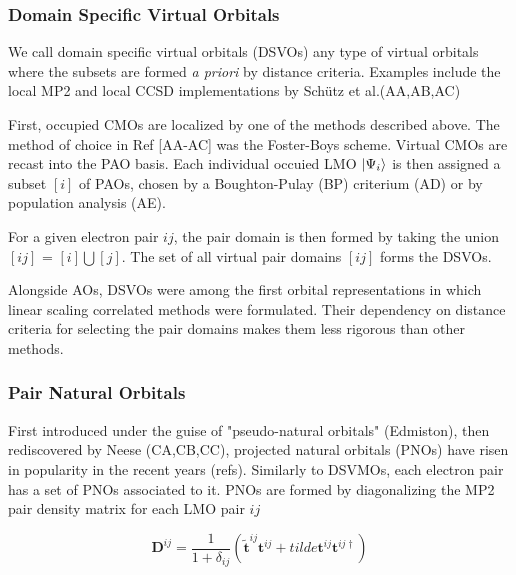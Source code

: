 \subsubsection*{Domain Specific Virtual Orbitals}

We call domain specific virtual orbitals (DSVOs) any type of virtual orbitals where the subsets are formed \emph{a priori} by distance criteria. Examples include the local MP2 and local CCSD implementations by Schütz et al.(AA,AB,AC)

First, occupied CMOs are localized by one of the methods described above. The method of choice in Ref [AA-AC] was the Foster-Boys scheme. Virtual CMOs are recast into the PAO basis. Each individual occuied LMO $\ket{\Psi_i}$ is then assigned a subset $[i]$ of PAOs, chosen by a Boughton-Pulay (BP) criterium (AD) or by population analysis (AE). 

For a given electron pair $ij$, the pair domain is then formed by taking the union $[ij]$ = $[i] \bigcup [j]$. The set of all virtual pair domains $[ij]$ forms the DSVOs.

Alongside AOs, DSVOs were among the first orbital representations in which linear scaling correlated methods were formulated. Their dependency on distance criteria for selecting the pair domains makes them less rigorous than other methods. 


\subsubsection*{Pair Natural Orbitals}
First introduced under the guise of "pseudo-natural orbitals" (Edmiston), then rediscovered by Neese (CA,CB,CC), projected natural orbitals (PNOs) have risen in popularity in the recent years (refs). Similarly to DSVMOs, each electron pair has a set of PNOs associated to it. PNOs are formed by diagonalizing the MP2 pair density matrix for each LMO pair $ij$

\begin{equation}
\mathbf{D}^{ij} = \frac{1}{1+\delta_{ij}} \left(\tilde{\mathbf{t}}^{ij} \mathbf{t}^{ij} + tilde{\mathbf{t}}^{ij} \mathbf{t}^{ij\dagger} \right)
\end{equation}

